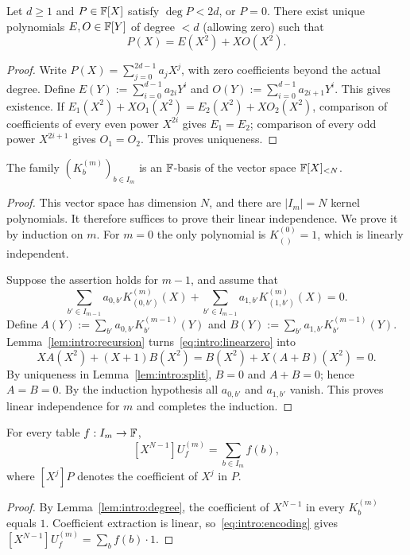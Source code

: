 \begin{lemma}\label{lem:intro:split}
Let $d\geq1$ and $P\in\mathbb{F}[X]$ satisfy $\deg P<2d$, or $P=0$. There exist unique polynomials $E,O\in\mathbb{F}[Y]$ of degree $<d$ (allowing zero) such that
\begin{equation}\label{eq:intro:split}
 P(X)=E(X^2)+XO(X^2).
\end{equation}
\end{lemma}
\begin{proof}
Write $P(X)=\sum_{j=0}^{2d-1}a_jX^j$, with zero coefficients beyond the actual degree. Define $E(Y):=\sum_{i=0}^{d-1}a_{2i}Y^i$ and $O(Y):=\sum_{i=0}^{d-1}a_{2i+1}Y^i$. This gives existence. If $E_1(X^2)+XO_1(X^2)=E_2(X^2)+XO_2(X^2)$, comparison of coefficients of every even power $X^{2i}$ gives $E_1=E_2$; comparison of every odd power $X^{2i+1}$ gives $O_1=O_2$. This proves uniqueness.
\end{proof}

\begin{proposition}\label{prop:intro:basis}
The family $(K_b^{(m)})_{b\in I_m}$ is an $\mathbb{F}$-basis of the vector space $\mathbb{F}[X]_{<N}$.
\end{proposition}
\begin{proof}
This vector space has dimension $N$, and there are $|I_m|=N$ kernel polynomials. It therefore suffices to prove their linear independence. We prove it by induction on $m$. For $m=0$ the only polynomial is $K_{()}^{(0)}=1$, which is linearly independent.

Suppose the assertion holds for $m-1$, and assume that
\begin{equation}\label{eq:intro:linearzero}
 \sum_{b'\in I_{m-1}}a_{0,b'}K_{(0,b')}^{(m)}(X)
 +\sum_{b'\in I_{m-1}}a_{1,b'}K_{(1,b')}^{(m)}(X)=0.
\end{equation}
Define $A(Y):=\sum_{b'}a_{0,b'}K_{b'}^{(m-1)}(Y)$ and $B(Y):=\sum_{b'}a_{1,b'}K_{b'}^{(m-1)}(Y)$. Lemma~\ref{lem:intro:recursion} turns~\eqref{eq:intro:linearzero} into
\[
 X A(X^2)+(X+1)B(X^2)=B(X^2)+X(A+B)(X^2)=0.
\]
By uniqueness in Lemma~\ref{lem:intro:split}, $B=0$ and $A+B=0$; hence $A=B=0$. By the induction hypothesis all $a_{0,b'}$ and $a_{1,b'}$ vanish. This proves linear independence for $m$ and completes the induction.
\end{proof}

\begin{corollary}\label{cor:intro:top}
For every table $f:I_m\to\mathbb{F}$,
\begin{equation}\label{eq:intro:top}
 [X^{N-1}]U_f^{(m)}=\sum_{b\in I_m}f(b),
\end{equation}
where $[X^j]P$ denotes the coefficient of $X^j$ in $P$.
\end{corollary}
\begin{proof}
By Lemma~\ref{lem:intro:degree}, the coefficient of $X^{N-1}$ in every $K_b^{(m)}$ equals $1$. Coefficient extraction is linear, so~\eqref{eq:intro:encoding} gives $[X^{N-1}]U_f^{(m)}=\sum_b f(b)\cdot1$.
\end{proof}
